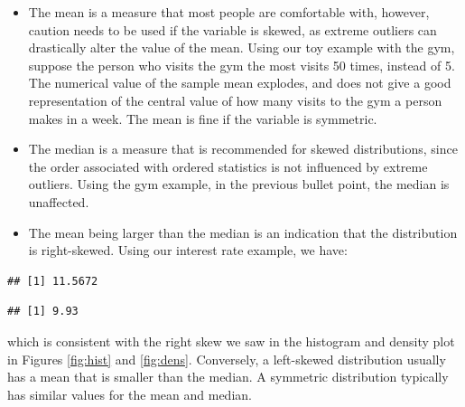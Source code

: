 \documentclass[
]{book}
\newenvironment{Shaded}{\begin{snugshade}}{\end{snugshade}}
\newcommand{\FunctionTok}[1]{\textcolor[rgb]{0.13,0.29,0.53}{\textbf{#1}}}
\newcommand{\NormalTok}[1]{#1}
\newcommand{\SpecialCharTok}[1]{\textcolor[rgb]{0.81,0.36,0.00}{\textbf{#1}}}
\begin{document}
\begin{itemize}
\item
  The mean is a measure that most people are comfortable with, however, caution needs to be used if the variable is skewed, as extreme outliers can drastically alter the value of the mean. Using our toy example with the gym, suppose the person who visits the gym the most visits 50 times, instead of 5. The numerical value of the sample mean explodes, and does not give a good representation of the central value of how many visits to the gym a person makes in a week. The mean is fine if the variable is symmetric.
\item
  The median is a measure that is recommended for skewed distributions, since the order associated with ordered statistics is not influenced by extreme outliers. Using the gym example, in the previous bullet point, the median is unaffected.
\item
  The mean being larger than the median is an indication that the distribution is right-skewed. Using our interest rate example, we have:
\end{itemize}

\begin{Shaded}
\end{Shaded}

\begin{verbatim}
## [1] 11.5672
\end{verbatim}

\begin{Shaded}
\end{Shaded}

\begin{verbatim}
## [1] 9.93
\end{verbatim}

which is consistent with the right skew we saw in the histogram and density plot in Figures \ref{fig:hist} and \ref{fig:dens}. Conversely, a left-skewed distribution usually has a mean that is smaller than the median. A symmetric distribution typically has similar values for the mean and median.
\end{document}
